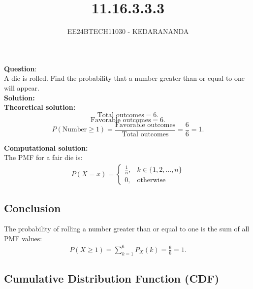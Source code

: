 \documentclass[journal]{IEEEtran}
\begin{document}
	
	
	\vspace{3cm}
	
	\title{11.16.3.3.3}
	\author{EE24BTECH11030 - KEDARANANDA }
	{\let\newpage\relax\maketitle}
	
	\renewcommand{\thefigure}{\theenumi}
	\renewcommand{\thetable}{\theenumi}
	\setlength{\intextsep}{10pt} %
	
	
	\renewcommand{\thetable}{\theenumi}
	
	
	\textbf{Question}:\\
	A die is rolled. Find the probability that a number greater than or equal to one will appear.\\
	\textbf{Solution: }\\
	\textbf{Theoretical solution: }\\
	\[
	\text{Total outcomes} = 6.
	\]
	\[
	\text{Favorable outcomes} = 6.
	\]
	\[
	P(\text{Number} \geq 1) = \frac{\text{Favorable outcomes}}{\text{Total outcomes}} = \frac{6}{6} = 1.
	\]
	
	\textbf{Computational solution: }\\
	The PMF for a fair die is:
	\begin{align}
		P(X = x) =
		\begin{cases}
			\frac{1}{n}, & k \in \{1, 2,\dots ,n\} \\
			0, & \text{otherwise}
		\end{cases}
	\end{align}	
	\subsection*{Conclusion}
	The probability of rolling a number greater than or equal to one is the sum of all PMF values:
	\begin{align}
		P(X \geq 1) = \sum_{k=1}^{6} P_X(k) = \frac{6}{6} = 1.
	\end{align}
	\subsection*{Cumulative Distribution Function (CDF)}
	
\end{document}
